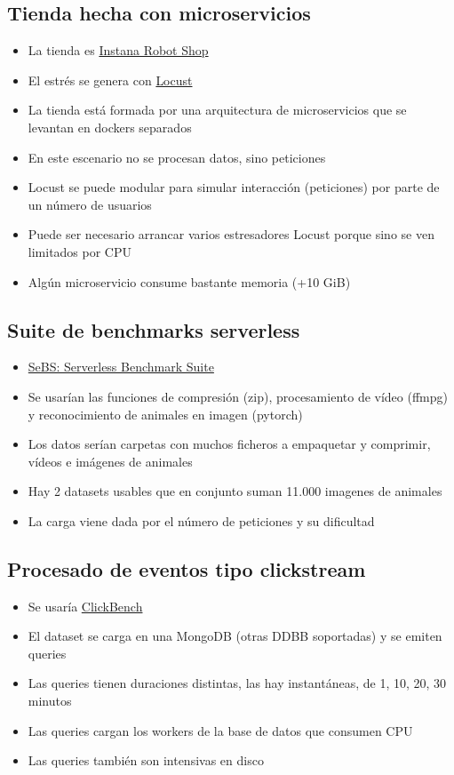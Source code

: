 \documentclass[preprint,3p]{elsarticle}
\begin{document}
\subsection{Tienda hecha con microservicios}

\begin{itemize}
	\item La tienda es \href{https://github.com/instana/robot-shop}{Instana Robot Shop}
	\item El estrés se genera con \href{https://locust.io/}{Locust}
	\item La tienda está formada por una arquitectura de microservicios que se levantan en dockers separados
	\item En este escenario no se procesan datos, sino peticiones
	\item Locust se puede modular para simular interacción (peticiones) por parte de un número de usuarios
	\item Puede ser necesario arrancar varios estresadores Locust porque sino se ven limitados por CPU
	\item Algún microservicio consume bastante memoria (+10 GiB)
\end{itemize}

\subsection{Suite de benchmarks serverless}

\begin{itemize}
	\item \href{https://github.com/spcl/serverless-benchmarks}{SeBS: Serverless Benchmark Suite}
	\item Se usarían las funciones de compresión (zip), procesamiento de vídeo (ffmpg) y reconocimiento de animales en imagen (pytorch)
	\item Los datos serían carpetas con muchos ficheros a empaquetar y comprimir, vídeos e imágenes de animales
	\item Hay 2 datasets usables que en conjunto suman 11.000 imagenes de animales
	\item La carga viene dada por el número de peticiones y su dificultad
\end{itemize}


\subsection{Procesado de eventos tipo clickstream}

\begin{itemize}
	\item Se usaría \href{https://github.com/ClickHouse/ClickBench}{ClickBench}
	\item El dataset se carga en una MongoDB (otras DDBB soportadas) y se emiten queries
	\item Las queries tienen duraciones distintas, las hay instantáneas, de 1, 10, 20, 30 minutos
	\item Las queries cargan los workers de la base de datos que consumen CPU
	\item Las queries también son intensivas en disco
\end{itemize}
\end{document}
